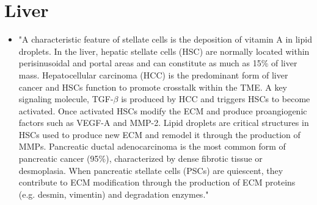 \documentclass[11pt,a4paper]{article}
\begin{document}
\section{Liver}
\begin{itemize}
\item  "A characteristic feature of stellate cells is the deposition of vitamin A in lipid droplets. In the liver, hepatic stellate cells (HSC) are normally located within perisinusoidal and portal areas and can constitute as much as 15\% of liver mass. Hepatocellular carcinoma (HCC) is the predominant form of liver cancer and HSCs function to promote crosstalk within the TME. A key signaling molecule, TGF-$\beta$ is produced by HCC and triggers HSCs to become activated. Once activated HSCs modify the ECM and produce proangiogenic factors such as VEGF-A and MMP-2. Lipid droplets are critical structures in HSCs used to produce new ECM and remodel it through the production of MMPs. Pancreatic ductal adenocarcinoma is the most common form of pancreatic cancer (95\%), characterized by dense fibrotic tissue or desmoplasia. When pancreatic stellate cells (PSCs) are quiescent, they contribute to ECM modification through the production of ECM proteins (e.g. desmin, vimentin) and degradation enzymes." \cite{Anderson2020}
\end{itemize}
\end{document}
